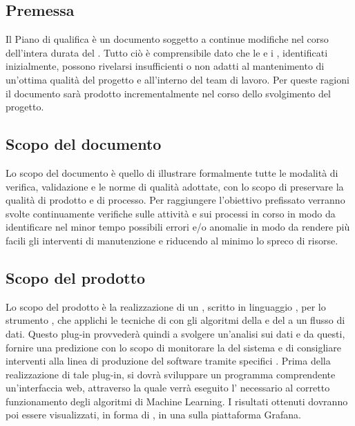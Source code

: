 \documentclass[../piano-di-qualifica.tex]{subfiles}
\begin{document}
\subsection{Premessa}%
\label{sub:premessa}
Il Piano di qualifica è un documento soggetto a continue modifiche nel corso dell'intera durata del .
Tutto ciò è comprensibile dato che le  e i , identificati inizialmente, possono rivelarsi insufficienti o non adatti al mantenimento di un'ottima qualità del progetto e all'interno del team di lavoro.
Per queste ragioni il documento sarà prodotto incrementalmente nel corso dello svolgimento del progetto.

\subsection{Scopo del documento}%
\label{sub:scopo_del_documento}
Lo scopo del documento è quello di illustrare formalmente tutte le modalità di verifica, validazione e le norme di qualità adottate, con lo scopo di preservare la qualità di prodotto e di processo.
Per raggiungere l'obiettivo prefissato verranno svolte continuamente verifiche sulle attività e sui processi in corso in modo da identificare nel minor tempo possibili errori e/o anomalie in modo da rendere più facili gli interventi di manutenzione e riducendo al minimo lo spreco di risorse.

\subsection{Scopo del prodotto}%
\label{sub:scopo_del_prodotto}
Lo scopo del prodotto è la realizzazione di un , scritto in linguaggio , per lo strumento  ,
che applichi le tecniche di  con gli algoritmi della  e del  a un flusso di dati.
Questo plug-in provvederà quindi a svolgere un'analisi sui dati e da questi, fornire una predizione con lo scopo di monitorare la  del sistema e di consigliare 
interventi alla linea di produzione del software tramite specifici .
Prima della realizzazione di tale plug-in, si dovrà sviluppare un programma comprendente un'interfaccia web, attraverso la quale verrà eseguito l' necessario al corretto
funzionamento degli algoritmi di Machine Learning.
I risultati ottenuti dovranno poi essere visualizzati, in forma di , in una  sulla piattaforma Grafana.
\end{document}
